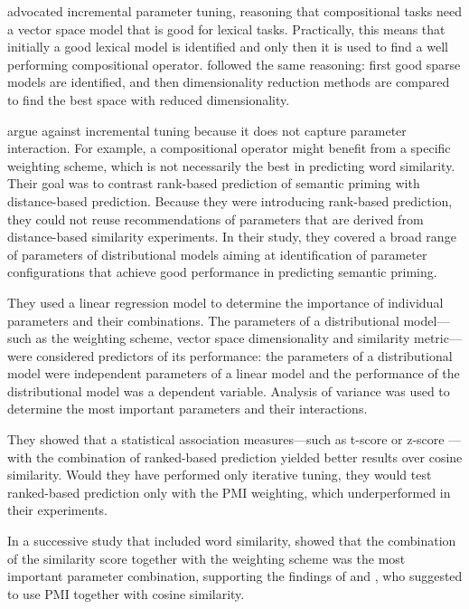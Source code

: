 \citet{kiela-clark:2014:CVSC} advocated incremental parameter tuning, reasoning that compositional tasks need a vector space model that is good for lexical tasks. Practically, this means that initially a good lexical model is identified and only then it is used to find a well performing compositional operator. \citet{BullinariaLevy2012} followed the same reasoning: first good sparse models are identified, and then dimensionality reduction methods are compared to find the best space with reduced dimensionality.

\citet{lapesa-evert:2013:CMCL} argue against incremental tuning because it does not capture parameter interaction. For example, a compositional operator might benefit from a specific weighting scheme, which is not necessarily the best in predicting word similarity. Their goal was to contrast rank-based prediction of semantic priming with distance-based prediction. Because they were introducing rank-based prediction, they could not reuse recommendations of parameters that are derived from distance-based similarity experiments. In their study, they covered a broad range of parameters of distributional models aiming at identification of parameter configurations that achieve good performance in predicting semantic priming.

They used a linear regression model to determine the importance of individual parameters and their combinations. The parameters of a distributional model---such as the weighting scheme, vector space dimensionality and similarity metric---were considered predictors of its performance: the parameters of a distributional model were independent parameters of a linear model and the performance of the distributional model was a dependent variable. Analysis of variance was used to determine the most important parameters and their interactions.

They showed that a statistical association measures---such as t-score or z-score \cite{Evert05}---with the combination of ranked-based prediction yielded better results over cosine similarity. Would they have performed only iterative tuning, they would test ranked-based prediction only with the PMI weighting, which underperformed in their experiments.

In a successive study that included word similarity, \citet{lapesa2014large} showed that the combination of the similarity score together with the weighting scheme was the most important parameter combination, supporting the findings of  and , who suggested to use PMI together with cosine similarity.

